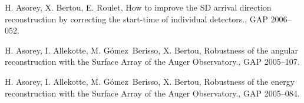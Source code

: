 \begin{etaremune}
\item {}H. Asorey, X. Bertou, E. Roulet, {{How to improve the SD arrival direction reconstruction by correcting the start-time of individual detectors.}}, GAP 2006--052.

\item {}H. Asorey, I. Allekotte, M. Gómez~Berisso, X. Bertou, {{Robustness of the angular reconstruction with the Surface Array of the Auger Observatory.}}, GAP 2005--107.

\item {}H. Asorey, I. Allekotte, M. Gómez~Berisso, X. Bertou, {{Robustness of the energy reconstruction with the Surface Array of the Auger Observatory.}}, GAP 2005--084.
\end{etaremune}
